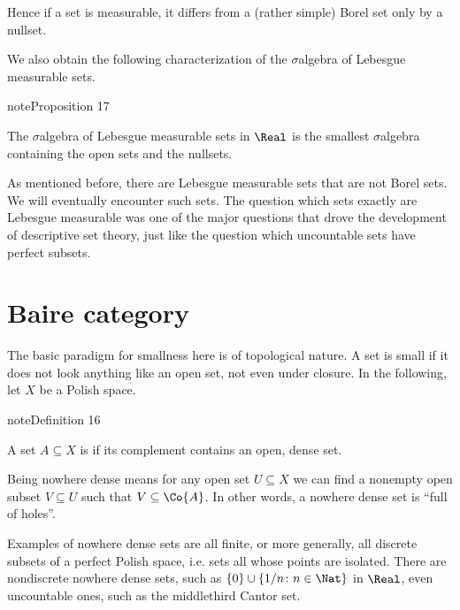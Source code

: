 \documentclass[letterpaper,10pt,english]{jupyterBook}
\begin{document}
\sphinxAtStartPar
Hence if a set is measurable, it differs from a (rather simple) Borel set only by a nullset.

\sphinxAtStartPar
We also obtain the following characterization of the \(\sigma\)\sphinxhyphen{}algebra of Lebesgue measurable sets.
\label{measure:prop-measurable-sigma-algebra}
\begin{sphinxadmonition}{note}{Proposition 17}



\sphinxAtStartPar
The \(\sigma\)\sphinxhyphen{}algebra of Lebesgue measurable sets in \(\Real\) is the smallest \(\sigma\)\sphinxhyphen{}algebra containing the open sets and the nullsets.
\end{sphinxadmonition}

\sphinxAtStartPar
As mentioned before, there are Lebesgue measurable sets that are not Borel sets. We will eventually encounter such sets. The question which sets exactly are Lebesgue measurable was one of the major questions that drove the development of descriptive set theory, just like the question which uncountable sets have perfect subsets.


\section{Baire category}
\label{\detokenize{measure:baire-category}}
\sphinxAtStartPar
The basic paradigm for smallness here is of topological nature. A set is small if it does not look anything like an open set, not even under closure. In the following, let \(X\) be a Polish space.
\label{measure:def-nowhere-dense}
\begin{sphinxadmonition}{note}{Definition 16}



\sphinxAtStartPar
A set \(A \subseteq X\) is  if its complement contains an open, dense set.
\end{sphinxadmonition}

\sphinxAtStartPar
Being nowhere dense means for any open set \(U \subseteq X\) we can find a non\sphinxhyphen{}empty open subset \(V \subseteq U\) such that \(V \subseteq \Co{A}\). In other words, a nowhere dense set is “full of holes”.

\sphinxAtStartPar
Examples of nowhere dense sets are all finite, or more generally, all discrete subsets of a perfect Polish space, i.e. sets all whose points are isolated. There are non\sphinxhyphen{}discrete nowhere dense sets, such as \(\{0\} \cup \{1/n \colon n \in \Nat \}\) in \(\Real\), even uncountable ones, such as the middle\sphinxhyphen{}third Cantor set.
\end{document}
